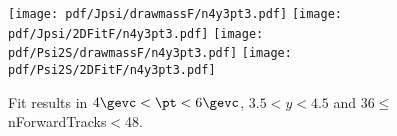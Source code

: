\begin{figure}[H]
\begin{center}
\texttt{[image: pdf/Jpsi/drawmassF/n4y3pt3.pdf]}
\texttt{[image: pdf/Jpsi/2DFitF/n4y3pt3.pdf]}
\vspace*{-0.5cm}
\texttt{[image: pdf/Psi2S/drawmassF/n4y3pt3.pdf]}
\texttt{[image: pdf/Psi2S/2DFitF/n4y3pt3.pdf]}
\vspace*{-0.5cm}
\end{center}
\caption{Fit results in $4\gevc<\pt<6\gevc$, $3.5<y<4.5$ and 36$\leq$nForwardTracks$<$48.}
\label{Fitn4y3pt3}
\end{figure}
